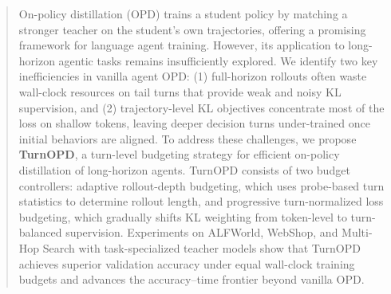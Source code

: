 \begin{abstract}
On-policy distillation (OPD) trains a student policy by matching a stronger teacher on the student's own trajectories, offering a promising framework for language agent training. However, its application to long-horizon agentic tasks remains insufficiently explored. We identify two key inefficiencies in vanilla agent OPD: (1) full-horizon rollouts often waste wall-clock resources on tail turns that provide weak and noisy KL supervision, and (2) trajectory-level KL objectives concentrate most of the loss on shallow tokens, leaving deeper decision turns under-trained once initial behaviors are aligned. To address these challenges, we propose \textbf{TurnOPD}, a turn-level budgeting strategy for efficient on-policy distillation of long-horizon agents. TurnOPD consists of two budget controllers: adaptive rollout-depth budgeting, which uses probe-based turn statistics to determine rollout length, and progressive turn-normalized loss budgeting, which gradually shifts KL weighting from token-level to turn-balanced supervision. Experiments on ALFWorld, WebShop, and Multi-Hop Search with task-specialized teacher models show that TurnOPD achieves superior validation accuracy under equal wall-clock training budgets and advances the accuracy--time frontier beyond vanilla OPD.
\end{abstract}
